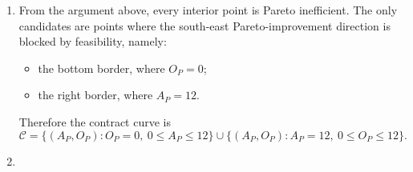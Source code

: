 \documentclass[12pt]{article}
\begin{document}
\begin{enumerate}[label=(\alph*)]
\begin{center}
\end{center}
    




    To test Pareto efficiency, consider any interior feasible allocation \((A_P,O_P)\) with
    \[
    0<A_P<12,\qquad 0<O_P<12.
    \]
    Suppose we move slightly in the south-east direction:
    \[
    \Delta A_P=\varepsilon>0,\qquad \Delta O_P=-\eta<0.
    \]
    Then Paul's utility changes by
    \[
    \Delta U_P = 2\varepsilon-\eta.
    \]
    David receives the opposite change:
    \[
    \Delta A_D=-\varepsilon,\qquad \Delta O_D=\eta,
    \]
    so David's utility changes by
    \[
    \Delta U_D = -\varepsilon + 2\eta.
    \]
    If we choose \(\eta\) so that
    \[
    \frac{\varepsilon}{2}<\eta<2\varepsilon,
    \]
    then
    \[
    \Delta U_P>0
    \qquad\text{and}\qquad
    \Delta U_D>0.
    \]
    Therefore every interior point is Pareto inefficient.

    Since the solution sheet identifies A, B, and C as interior points of this type, they are not Pareto efficient. By contrast, D lies on the bottom border and E lies on the right border. At such points, there is no feasible south-east move remaining inside the Edgeworth box, so no Pareto improvement is possible.

    Hence
    \[
    \boxed{\text{A, B, and C are not Pareto efficient, while D and E are Pareto efficient.}}
    \]

    \item
    From the argument above, every interior point is Pareto inefficient. The only candidates are points where the south-east Pareto-improvement direction is blocked by feasibility, namely:
    \begin{itemize}[leftmargin=*]
        \item the bottom border, where \(O_P=0\);
        \item the right border, where \(A_P=12\).
    \end{itemize}
    Therefore the contract curve is
    \[
    \boxed{\mathcal C
    =\{(A_P,O_P): O_P=0,\ 0\le A_P\le 12\}
    \cup
    \{(A_P,O_P): A_P=12,\ 0\le O_P\le 12\}.}
    \]

    \item

\end{enumerate}
\end{document}
